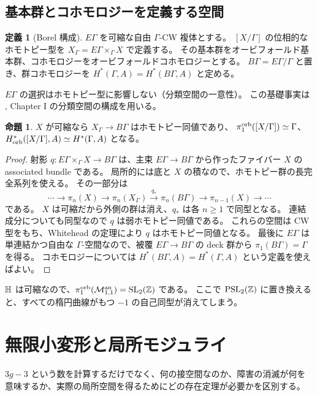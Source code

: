 \documentclass[dvipdfmx,a4paper,11pt]{article}
\theoremstyle{definition}
\newtheorem{prop}[thm]{命題}
\newtheorem{dfn}[thm]{定義}
\newenvironment{aim}{\begin{tcolorbox}[mybox,colback=green!3,title=この章で考えること,fonttitle=\bfseries]}{\end{tcolorbox}}
\DeclareMathOperator{\SL}{SL}\DeclareMathOperator{\PGL}{PGL}\DeclareMathOperator{\PSL}{PSL}
\begin{document}
\subsection{基本群とコホモロジーを定義する空間}
\begin{dfn}[Borel 構成]\label{def:borel}
$E\Gamma$ を可縮な自由 $\Gamma$-CW 複体とする。
$[X/\Gamma]$ の位相的なホモトピー型を $X_\Gamma=E\Gamma\times_\Gamma X$ で定義する。
その基本群をオービフォールド基本群、コホモロジーをオービフォールドコホモロジーとする。
$B\Gamma=E\Gamma/\Gamma$ と置き、群コホモロジーを $H^*(\Gamma,A)=H^*(B\Gamma,A)$ と定める。
\end{dfn}
$E\Gamma$ の選択はホモトピー型に影響しない（分類空間の一意性）。
この基礎事実は \cite{Brown}, Chapter I の分類空間の構成を用いる。
\begin{prop}\label{prop:borelcontractible}
$X$ が可縮なら $X_\Gamma\to B\Gamma$ はホモトピー同値であり、
$\pi_1^{\rm orb}([X/\Gamma])\simeq\Gamma$、
$H^*_{\rm orb}([X/\Gamma],A)\simeq H^*(\Gamma,A)$ となる。
\end{prop}
\begin{proof}
射影 $q:E\Gamma\times_\Gamma X\to B\Gamma$ は、主束 $E\Gamma\to B\Gamma$ から作ったファイバー $X$ の associated bundle である。
局所的には底と $X$ の積なので、ホモトピー群の長完全系列を使える。
その一部分は
\[
\cdots\to\pi_n(X)\to\pi_n(X_\Gamma)\xrightarrow{q_*}\pi_n(B\Gamma)
\to\pi_{n-1}(X)\to\cdots
\]
である。
$X$ は可縮だから外側の群は消え、$q_*$ は各 $n\ge1$ で同型となる。
連結成分についても同型なので $q$ は弱ホモトピー同値である。
これらの空間は CW 型をもち、Whitehead の定理により $q$ はホモトピー同値となる。
最後に $E\Gamma$ は単連結かつ自由な $\Gamma$-空間なので、被覆 $E\Gamma\to B\Gamma$ の deck 群から $\pi_1(B\Gamma)=\Gamma$ を得る。
コホモロジーについては $H^*(B\Gamma,A)=H^*(\Gamma,A)$ という定義を使えばよい。
\end{proof}
$\mathbb H$ は可縮なので、$\pi_1^{\rm orb}(\MM_{1,1}^{\rm an})=\SL_2(\Z)$ である。
ここで $\PSL_2(\Z)$ に置き換えると、すべての楕円曲線がもつ $-1$ の自己同型が消えてしまう。

\par\bigskip\Needspace{.70\textheight}
\section{無限小変形と局所モジュライ}\label{sec:def}
\begin{aim}
$3g-3$ という数を計算するだけでなく、何の接空間なのか、障害の消滅が何を意味するか、実際の局所空間を得るためにどの存在定理が必要かを区別する。
\end{aim}
\end{document}
